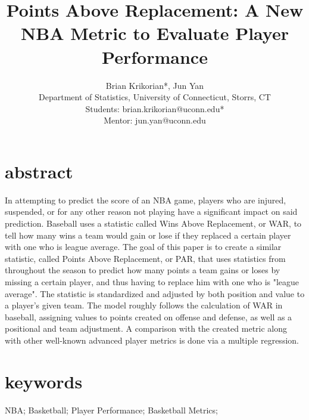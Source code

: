\documentclass[12pt]{article}
\title{Points Above Replacement: A New NBA Metric to Evaluate Player Performance}
\author{
Brian Krikorian*, Jun Yan \\ \medskip 
Department of Statistics, University of Connecticut, Storrs, CT  \\  \medskip 
Students: brian.krikorian@uconn.edu* \\
Mentor: jun.yan@uconn.edu 
}
\begin{document}
\section*{abstract}
In attempting to predict the score of an NBA game, players who are injured, suspended, or for any other reason not playing have a significant impact on said prediction. Baseball uses a statistic called Wins Above Replacement, or WAR, to tell how many wins a 
team would gain or lose if they replaced a certain player with one who is league average. The goal of this paper is to create a similar statistic, called Points Above Replacement, or PAR, that uses statistics from throughout the season to predict how many points a 
team gains or loses by missing a certain player, and thus having to replace him with one who is "league average". The statistic is standardized and adjusted by both position and value to a player's given team. The model roughly follows the calculation of WAR in 
baseball, assigning values to points created on offense and defense, as well as a positional and team adjustment. A comparison with the created metric along with other well-known advanced player metrics is done via a multiple regression.

\section*{keywords} 
NBA; Basketball; Player Performance; Basketball Metrics;
\vspace{.12 in}
\end{document}
